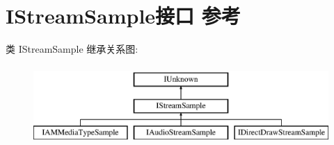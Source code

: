\hypertarget{interface_i_stream_sample}{}\section{I\+Stream\+Sample接口 参考}
\label{interface_i_stream_sample}
类 I\+Stream\+Sample 继承关系图\+:\begin{figure}[H]
\begin{center}
\leavevmode
\includegraphics[height=3.000000cm]{interface_i_stream_sample}
\end{center}
\end{figure}
